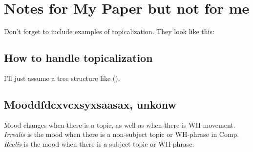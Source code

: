 \documentclass[12pt]{article}
\begin{document}
\section*{Notes for My Paper but not for me }

Don't forget to include examples of topicalization.
They look like this:

{\small
{}
}

\subsection*{How to handle topicalization}

I'll just assume a tree structure like ().

{\small
{}
}

\subsection*{Mooddfdcxvcxsyxsaasax, unkonw}

Mood changes when there is a topic, as well as when
there is WH-movement.  \emph{Irrealis} is the mood when
there is a non-subject topic or WH-phrase in Comp.
\emph{Realis} is the mood when there is a subject topic
or WH-phrase.
\end{document}
